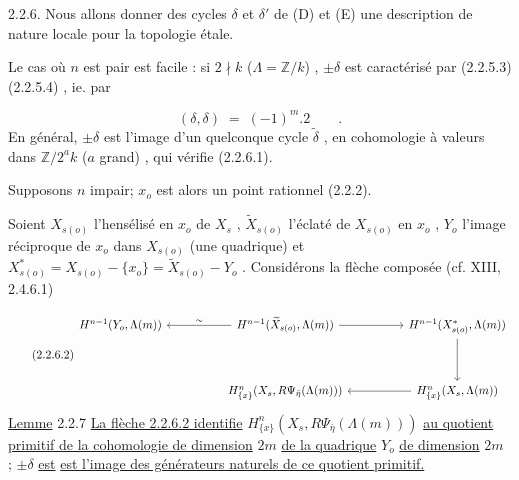 2.2.6. Nous allons donner des cycles  $\delta$  et  $\delta'$  de  (D) et (E) une description de nature locale pour la topologie étale.

Le cas où  $n$  est pair est facile : si  $2 \nmid k$  ($\Lambda = \mathbb{Z}/k$)  ,  $\pm \delta$  est caractérisé par (2.2.5.3) (2.2.5.4) , ie. par

\begin{equation}\tag{2.2.6.1}
(\delta,\delta) \;=\; (-1)^{m}.2 \qquad .
\end{equation}
En général,  $\pm \delta$  est l'image d'un quelconque cycle  $\widetilde{\delta}$ , en cohomologie à valeurs dans  $\mathbb{Z}/2^{a}k$  ($a$  grand) , qui vérifie (2.2.6.1).

Supposons  $n$  impair; $x_o$  est alors un point rationnel (2.2.2).

Soient  $X_{s(o)}$  l'hensélisé en  $x_o$  de  $X_s$ ,  $\widetilde{X}_{s(o)}$  l'éclaté de  $X_{s(o)}$  en  $x_o$ ,  $Y_o$  l'image réciproque de  $x_o$  dans  $X_{s(o)}$  (une quadrique) et  $X^{*}_{s(o)} = X_{s(o)} - \{x_o\} = \widetilde{X}_{s(o)} - Y_o$ . Considérons la flèche composée  (cf. XIII, 2.4.6.1)

\begin{equation}\tag{2.2.6.2}
\begin{tikzcd}[column sep=huge, row sep=huge]
H^{n-1}(Y_o,\Lambda(m)) & H^{n-1}(\widetilde{X}_{s(o)},\Lambda(m)) \arrow[l,"\sim"'] \arrow[r] & H^{n-1}(X^{*}_{s(o)},\Lambda(m)) \arrow[d] \\
{} & H^{n}_{\{x\}}(X_s,R\Psi_{\bar{\eta}}(\Lambda(m))) & H^{n}_{\{x\}}(X_s,\Lambda(m)) \arrow[l]
\end{tikzcd}
\end{equation}
\underline{Lemme} 2.2.7  \underline{La flèche 2.2.6.2 identifie}  $H^{n}_{\{x\}}(X_s,R\Psi_{\bar{\eta}}(\Lambda(m)))$  \underline{au quotient primitif de la cohomologie de dimension}  $2m$  \underline{de la quadrique}  $Y_o$  \underline{de dimension}  $2m$  ;  $\pm \delta$  \underline{est}
\underline{est l'image des générateurs naturels de ce quotient primitif.}

